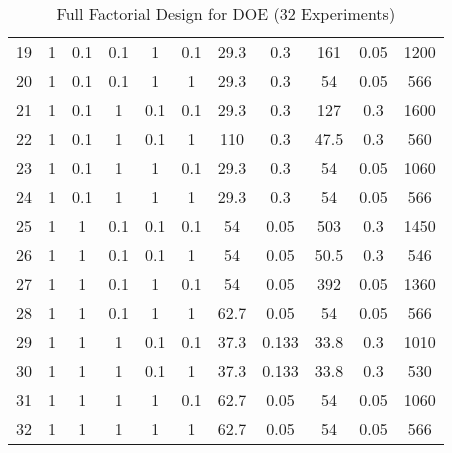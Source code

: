 \begin{table}[h!]
{\begin{tabular}{ccccccccccc}
        19 & 1 & 0.1 & 0.1 & 1 & 0.1 & 29.3 & 0.3 & 161 & 0.05 & 1200 \\
        20 & 1 & 0.1 & 0.1 & 1 & 1 & 29.3 & 0.3 & 54 & 0.05 & 566 \\
        21 & 1 & 0.1 & 1 & 0.1 & 0.1 & 29.3 & 0.3 & 127 & 0.3 & 1600 \\
        22 & 1 & 0.1 & 1 & 0.1 & 1 & 110 & 0.3 & 47.5 & 0.3 & 560 \\
        23 & 1 & 0.1 & 1 & 1 & 0.1 & 29.3 & 0.3 & 54 & 0.05 & 1060 \\
        24 & 1 & 0.1 & 1 & 1 & 1 & 29.3 & 0.3 & 54 & 0.05 & 566 \\
        25 & 1 & 1 & 0.1 & 0.1 & 0.1 & 54 & 0.05 & 503 & 0.3 & 1450 \\
        26 & 1 & 1 & 0.1 & 0.1 & 1 & 54 & 0.05 & 50.5 & 0.3 & 546 \\
        27 & 1 & 1 & 0.1 & 1 & 0.1 & 54 & 0.05 & 392 & 0.05 & 1360 \\
        28 & 1 & 1 & 0.1 & 1 & 1 & 62.7 & 0.05 & 54 & 0.05 & 566 \\
        29 & 1 & 1 & 1 & 0.1 & 0.1 & 37.3 & 0.133 & 33.8 & 0.3 & 1010 \\
        30 & 1 & 1 & 1 & 0.1 & 1 & 37.3 & 0.133 & 33.8 & 0.3 & 530 \\
        31 & 1 & 1 & 1 & 1 & 0.1 & 62.7 & 0.05 & 54 & 0.05 & 1060 \\
        32 & 1 & 1 & 1 & 1 & 1 & 62.7 & 0.05 & 54 & 0.05 & 566 \\
        \bottomrule
    \end{tabular}
    }
    \caption{Full Factorial Design for DOE (32 Experiments)}
    \label{tab:experiments}
\end{table}
